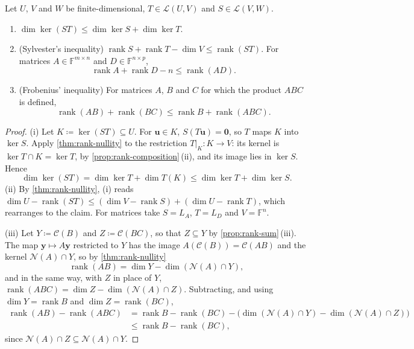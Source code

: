 \begin{theorem}
\label{thm:rank-inequalities}
Let $U$, $V$ and $W$ be finite-dimensional, $T\in\mathcal L(U,V)$ and $S\in\mathcal L(V,W)$.
\begin{enumerate}
\item $\dim\ker(ST)\le\dim\ker S+\dim\ker T$.
\item (Sylvester's inequality) $\operatorname{rank}S+\operatorname{rank}T-\dim V\le\operatorname{rank}(ST)$. For matrices $A\in\mathbb F^{m\times n}$ and $D\in\mathbb F^{n\times p}$,
\[
\operatorname{rank}A+\operatorname{rank}D-n\le\operatorname{rank}(AD).
\]
\item (Frobenius' inequality) For matrices $A$, $B$ and $C$ for which the product $ABC$ is defined,
\[
\operatorname{rank}(AB)+\operatorname{rank}(BC)\le\operatorname{rank}B+\operatorname{rank}(ABC).
\]
\end{enumerate}
\end{theorem}

\begin{proof}
(i) Let $K\coloneqq\ker(ST)\subseteq U$. For $\mathbf u\in K$, $S(T\mathbf u)=\mathbf 0$, so $T$ maps $K$ into $\ker S$. Apply \cref{thm:rank-nullity} to the restriction $T|_K\colon K\to V$: its kernel is $\ker T\cap K=\ker T$, by \cref{prop:rank-composition}\,(ii), and its image lies in $\ker S$. Hence
\[
\dim\ker(ST)=\dim\ker T+\dim T(K)\le\dim\ker T+\dim\ker S .
\]
(ii) By \cref{thm:rank-nullity}, (i) reads $\dim U-\operatorname{rank}(ST)\le(\dim V-\operatorname{rank}S)+(\dim U-\operatorname{rank}T)$, which rearranges to the claim. For matrices take $S=L_A$, $T=L_D$ and $V=\mathbb F^n$.

(iii) Let $Y\coloneqq\mathcal C(B)$ and $Z\coloneqq\mathcal C(BC)$, so that $Z\subseteq Y$ by \cref{prop:rank-sum}\,(iii). The map $\mathbf y\mapsto A\mathbf y$ restricted to $Y$ has the image $A(\mathcal C(B))=\mathcal C(AB)$ and the kernel $\mathcal N(A)\cap Y$, so by \cref{thm:rank-nullity}
\[
\operatorname{rank}(AB)=\dim Y-\dim(\mathcal N(A)\cap Y),
\]
and in the same way, with $Z$ in place of $Y$, $\operatorname{rank}(ABC)=\dim Z-\dim(\mathcal N(A)\cap Z)$.
Subtracting, and using $\dim Y=\operatorname{rank}B$ and $\dim Z=\operatorname{rank}(BC)$,
\[
\begin{aligned}
\operatorname{rank}(AB)-\operatorname{rank}(ABC)&=\operatorname{rank}B-\operatorname{rank}(BC)-\bigl(\dim(\mathcal N(A)\cap Y)-\dim(\mathcal N(A)\cap Z)\bigr)\\
&\le\operatorname{rank}B-\operatorname{rank}(BC),
\end{aligned}
\]
since $\mathcal N(A)\cap Z\subseteq\mathcal N(A)\cap Y$.
\end{proof}

